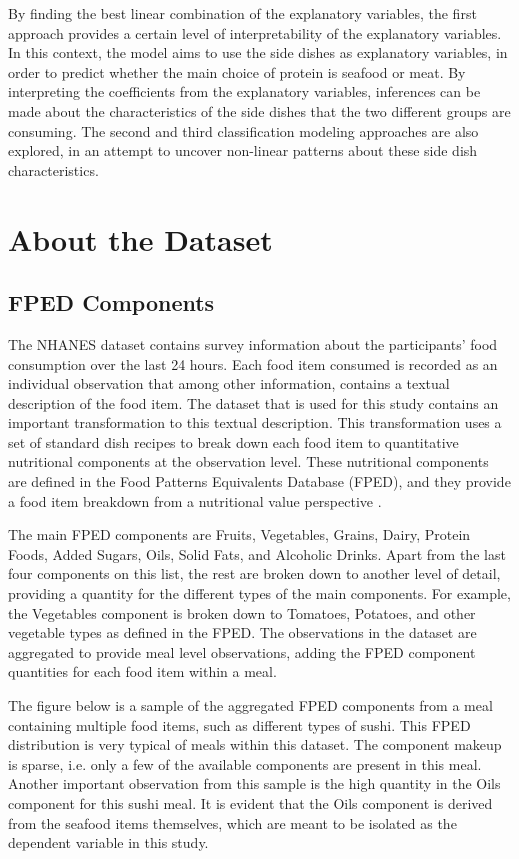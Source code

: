 \documentclass{article}
\begin{document}
By finding the best linear combination of the explanatory variables, the first approach provides a certain level of interpretability of the explanatory variables. In this context, the model aims to use the side dishes as explanatory variables, in order to predict whether the main choice of protein is seafood or meat. By interpreting the coefficients from the explanatory variables, inferences can be made about the characteristics of the side dishes that the two different groups are consuming. The second and third classification modeling approaches are also explored, in an attempt to uncover non-linear patterns about these side dish characteristics. 

\section{About the Dataset}
\label{sec:dataset}

\subsection{FPED Components}
\label{ssec:subhead}

The NHANES dataset contains survey information about the participants' food consumption over the last 24 hours. Each food item consumed is recorded as an individual observation that among other information, contains a textual description of the food item. The dataset that is used for this study contains an important transformation to this textual description. This transformation uses a set of standard dish recipes to break down each food item to quantitative nutritional components at the observation level. These nutritional components are defined in the Food Patterns Equivalents Database (FPED), and they provide a food item breakdown from a nutritional value perspective \cite{C2}. 

The main FPED components are Fruits, Vegetables, Grains, Dairy, Protein Foods, Added Sugars, Oils, Solid Fats, and Alcoholic Drinks. Apart from the last four components on this list, the rest are broken down to another level of detail, providing a quantity for the different types of the main components. For example, the Vegetables component is broken down to Tomatoes, Potatoes, and other vegetable types as defined in the FPED. The observations in the dataset are aggregated to provide meal level observations, adding the FPED component quantities for each food item within a meal. 

The figure below is a sample of the aggregated FPED components from a meal containing multiple food items, such as different types of sushi. This FPED distribution is very typical of meals within this dataset. The component makeup is sparse, i.e. only a few of the available components are present in this meal. Another important observation from this sample is the high quantity in the Oils component for this sushi meal. It is evident that the Oils component is derived from the seafood items themselves, which are meant to be isolated as the dependent variable in this study.
\end{document}
